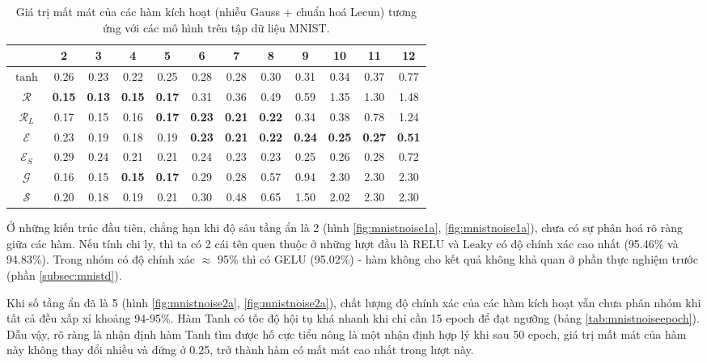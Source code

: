 \begin{table}[ht!]
\centering
\def\arraystretch{1.3}
\begin{tabular}{c|c|c|c|c|c|c|c|c|c|c|c|}
\cline{2-12}
                        & 2    & 3    & 4    & 5    & 6    & 7    & 8    & 9    & 10   & 11   & 12   \\ \hline
\multicolumn{1}{|c|}{$\tanh$} & 0.26 & 0.23 & 0.22 & 0.25 & 0.28 & 0.28 & 0.30 & 0.31 & 0.34 & 0.37 & 0.77 \\ \hline
\multicolumn{1}{|c|}{$\mathcal{R}$} & \textbf{0.15} & \textbf{0.13} & \textbf{0.15} & \textbf{0.17} & 0.31 & 0.36 & 0.49 & 0.59 & 1.35 & 1.30 & 1.48 \\ \hline
\multicolumn{1}{|c|}{$\mathcal{R}_L$} & 0.17 & 0.15 & 0.16 & \textbf{0.17} & \textbf{0.23} & \textbf{0.21} & \textbf{0.22} & 0.34 & 0.38 & 0.78 & 1.24 \\ \hline
\multicolumn{1}{|c|}{$\mathcal{E}$} & 0.23 & 0.19 & 0.18 & 0.19 & \textbf{0.23} & \textbf{0.21} & \textbf{0.22} & \textbf{0.24} & \textbf{0.25} & \textbf{0.27} & \textbf{0.51} \\ \hline
\multicolumn{1}{|c|}{$\mathcal{E}_S$} & 0.29 & 0.24 & 0.21 & 0.21 & 0.24 & 0.23 & 0.23 & 0.25 & 0.26 & 0.28 & 0.72 \\ \hline
\multicolumn{1}{|c|}{$\mathcal{G}$} & 0.16 & 0.15 & \textbf{0.15} & \textbf{0.17} & 0.29 & 0.28 & 0.57 & 0.94 & 2.30 & 2.30 & 2.30 \\ \hline
\multicolumn{1}{|c|}{$\mathcal{S}$} & 0.20 & 0.18 & 0.19 & 0.21 & 0.30 & 0.48 & 0.65 & 1.50 & 2.02 & 2.30 & 2.30 \\ \hline
\end{tabular}
\caption{Giá trị mất mát của các hàm kích hoạt (nhiễu Gauss + chuẩn hoá Lecun) tương ứng với các mô hình trên tập dữ liệu MNIST.}
\label{tab:mnistnoiseloss}
\end{table}

Ở những kiến trúc đầu tiên, chẳng hạn khi độ sâu tầng ẩn là 2 (hình \ref{fig:mnistnoise1a}, \ref{fig:mnistnoise1a}), chưa có sự phân hoá rõ ràng giữa các hàm.
Nếu tính chi ly, thì ta có 2 cái tên quen thuộc ở những lượt đầu là RELU và Leaky có độ chính xác cao nhất (95.46\% và 94.83\%).
Trong nhóm có độ chính xác $\approx$ 95\% thì có GELU (95.02\%) - hàm không cho kết quả không khả quan ở phần thực nghiệm trước (phần \ref{subsec:mnistd}).
\vspace{5pt}

Khi số tầng ẩn đã là 5 (hình \ref{fig:mnistnoise2a}, \ref{fig:mnistnoise2a}), chất lượng độ chính xác của các hàm kích hoạt vẫn chưa phân nhóm khi tất cả đều xấp xỉ khoảng 94-95\%.
Hàm Tanh có tốc độ hội tụ khá nhanh khi chỉ cần 15 epoch để đạt ngưỡng (bảng \ref{tab:mnistnoiseepoch}).
Dẫu vậy, rõ ràng là nhận định hàm Tanh tìm được hố cực tiểu nông là một nhận định hợp lý khi sau 50 epoch, giá trị mất mát của hàm này không thay đổi nhiều và đứng ở 0.25, trở thành hàm có mất mát cao nhất trong lượt này.

